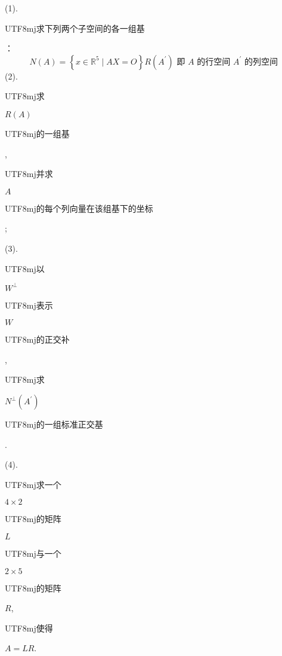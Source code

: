 \documentclass[10pt]{article}
\begin{document}
(1). \begin{CJK}{UTF8}{mj}求下列两个子空间的各一组基\end{CJK}：
$$
N(A)=\left\{x \in \mathbb{R}^{5} \mid A X=O\right\} R\left(A^{\prime}\right) \text { 即 } A \text { 的行空间 } A^{\prime} \text { 的列空间 }
$$
(2). \begin{CJK}{UTF8}{mj}求\end{CJK} $R(A)$ \begin{CJK}{UTF8}{mj}的一组基\end{CJK}, \begin{CJK}{UTF8}{mj}并求\end{CJK} $A$ \begin{CJK}{UTF8}{mj}的每个列向量在该组基下的坐标\end{CJK};

(3). \begin{CJK}{UTF8}{mj}以\end{CJK} $W^{\perp}$ \begin{CJK}{UTF8}{mj}表示\end{CJK} $W$ \begin{CJK}{UTF8}{mj}的正交补\end{CJK}, \begin{CJK}{UTF8}{mj}求\end{CJK} $N^{\perp}\left(A^{\prime}\right)$ \begin{CJK}{UTF8}{mj}的一组标准正交基\end{CJK}.

(4). \begin{CJK}{UTF8}{mj}求一个\end{CJK} $4 \times 2$ \begin{CJK}{UTF8}{mj}的矩阵\end{CJK} $L$ \begin{CJK}{UTF8}{mj}与一个\end{CJK} $2 \times 5$ \begin{CJK}{UTF8}{mj}的矩阵\end{CJK} $R$, \begin{CJK}{UTF8}{mj}使得\end{CJK} $A=L R$.
\end{document}
